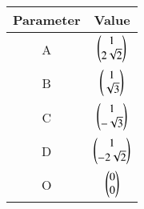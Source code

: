 
\begin{center}
\begin{tabular}{|c|c|}
\hline
\textbf{Parameter}	&\textbf{Value}\\ \hline
A	&$\begin{pmatrix}1\\2\sqrt{2}\end{pmatrix}$\\ \hline
B	&$\begin{pmatrix}1\\\sqrt{3}\end{pmatrix}$\\ \hline
C	&$\begin{pmatrix}1\\-\sqrt{3}\end{pmatrix}$\\ \hline
D	&$\begin{pmatrix}1\\-2\sqrt{2}\end{pmatrix}$\\ \hline
O	&$\begin{pmatrix}0\\0\end{pmatrix}$\\ \hline
\end{tabular}
\end{center}
